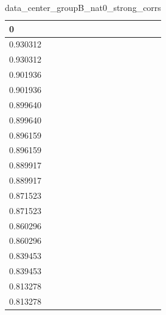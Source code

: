 \begin{table}
\caption{data_center_groupB_nat0_strong_corrs}
\label{tab:data_summary}
\begin{tabular}{lcr}
\toprule
0 \\
\midrule
0.930312 \\
0.930312 \\
0.901936 \\
0.901936 \\
0.899640 \\
0.899640 \\
0.896159 \\
0.896159 \\
0.889917 \\
0.889917 \\
0.871523 \\
0.871523 \\
0.860296 \\
0.860296 \\
0.839453 \\
0.839453 \\
0.813278 \\
0.813278 \\
\bottomrule
\end{tabular}
\end{table}
